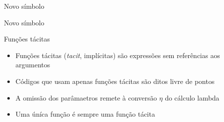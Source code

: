 \begin{frame}[fragile]{Novo símbolo}


\end{frame}

\begin{frame}[fragile]{Novo símbolo}


\end{frame}

\begin{frame}[fragile]{Funções tácitas}

    \begin{itemize}
        \item Funções tácitas (\textit{tacit}, implícitas) são expressões sem referências aos argumentos
        \pause

        \item Códigos que usam apenas funções tácitas são ditos livre de pontos
        \pause

        \item A omissão dos parâmaetros remete à conversão $\eta$ do cálculo lambda
        \pause

        \item Uma úníca função é sempre uma função tácita

    \end{itemize}

\end{frame}

